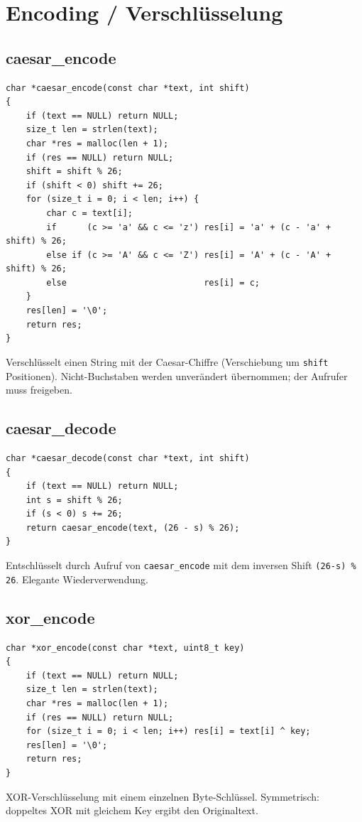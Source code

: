 \documentclass[10pt, a4paper]{article}
\begin{document}
\newpage
\section{Encoding / Verschl\"usselung}

\subsection{caesar\_encode}
\begin{lstlisting}
char *caesar_encode(const char *text, int shift)
{
    if (text == NULL) return NULL;
    size_t len = strlen(text);
    char *res = malloc(len + 1);
    if (res == NULL) return NULL;
    shift = shift % 26;
    if (shift < 0) shift += 26;
    for (size_t i = 0; i < len; i++) {
        char c = text[i];
        if      (c >= 'a' && c <= 'z') res[i] = 'a' + (c - 'a' + shift) % 26;
        else if (c >= 'A' && c <= 'Z') res[i] = 'A' + (c - 'A' + shift) % 26;
        else                           res[i] = c;
    }
    res[len] = '\0';
    return res;
}
\end{lstlisting}
Verschl\"usselt einen String mit der Caesar-Chiffre (Verschiebung um \texttt{shift} Positionen). Nicht-Buchstaben werden unver\"andert \"ubernommen; der Aufrufer muss freigeben.

\subsection{caesar\_decode}
\begin{lstlisting}
char *caesar_decode(const char *text, int shift)
{
    if (text == NULL) return NULL;
    int s = shift % 26;
    if (s < 0) s += 26;
    return caesar_encode(text, (26 - s) % 26);
}
\end{lstlisting}
Entschl\"usselt durch Aufruf von \texttt{caesar\_encode} mit dem inversen Shift \texttt{(26-s) \% 26}. Elegante Wiederverwendung.

\subsection{xor\_encode}
\begin{lstlisting}
char *xor_encode(const char *text, uint8_t key)
{
    if (text == NULL) return NULL;
    size_t len = strlen(text);
    char *res = malloc(len + 1);
    if (res == NULL) return NULL;
    for (size_t i = 0; i < len; i++) res[i] = text[i] ^ key;
    res[len] = '\0';
    return res;
}
\end{lstlisting}
XOR-Verschl\"usselung mit einem einzelnen Byte-Schl\"ussel. Symmetrisch: doppeltes XOR mit gleichem Key ergibt den Originaltext.
\end{document}

